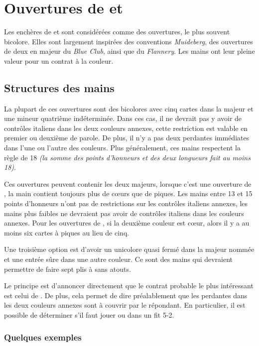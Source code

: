 \chapter{Ouvertures de \bid{2\HS} et \bid{2\SpS}}
Les enchères de \bid{2\HS} et\bid{2\SpS} sont considérées comme des ouvertures, le plus souvent bicolore. Elles sont largement inspirées des conventions \emph{Muideberg}, des ouvertures de deux en majeur du \emph{Blue Club}, ainsi que du \emph{Flannery}. Les mains ont leur pleine valeur pour un contrat à la couleur.
\section{Structures des mains}
La plupart de ces ouvertures sont des bicolores avec cinq cartes dans la majeur et une mineur quatrième indéterminée. Dans ces cas, il ne devrait pas y avoir de contrôles italiens dans les deux couleurs annexes, cette restriction est valable en premier ou deuxième de parole. De plus, il n'y a pas deux perdantes immédiates dans l'une ou l'autre des couleurs. Plus généralement, ces mains respectent la règle de 18 \emph{(la somme des points d'honneurs et des deux longueurs fait au moins 18)}.

Ces ouvertures peuvent contenir les deux majeurs, lorsque c'est une ouverture de \bid{2\HS}, la main contient toujours plus de cœurs que de piques. Les mains entre 13 et 15 points d'honneurs n'ont pas de restrictions sur les contrôles italiens annexes, les mains plus faibles ne devraient pas avoir de contrôles italiens dans les couleurs annexes. Pour les ouvertures de \bid{2\SpS}, si la deuxième couleur est cœur, alors il y a au moins six cartes à piques au lieu de cinq.

Une troisième option est d'avoir un unicolore quasi fermé dans la majeur nommée et une entrée sûre dans une autre couleur. Ce sont des mains qui devraient permettre de faire sept plis à sans atouts.

Le principe est d'annoncer directement que le contrat probable le plus intéressant est celui de \bid{2\HS/\SpS}. De plus, cela permet de dire préalablement que les perdantes dans les deux couleurs annexes sont à couvrir par le répondant. En particulier, il est possible de déterminer s'il faut jouer \bid{3\NT} ou \bid{4\HS/\SpS} dans un fit 5-2.
\subsection{Quelques exemples}
